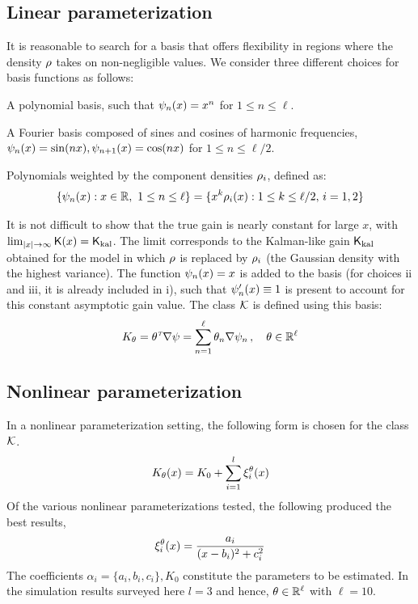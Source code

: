 \subsection*{Linear parameterization}
\label{s:linear_param}
It is reasonable to search for a basis that offers flexibility in regions where the density $\rho$ takes on non-negligible values. We consider three different choices for basis functions as follows:
\begin{romannum}
\item A polynomial basis, such that $\psi_n(x) = x^n$ for $1 \leq n \leq \ell$.
\item A Fourier basis composed of sines and cosines of harmonic frequencies, $\psi_n(x) = \sin(n x), \psi_{n+1}(x) = \cos(n x)$ for $1 \leq n \leq \ell/2$.
\item Polynomials weighted by the component densities $\rho_i$, defined as: 
\begin{equation}
\{\basis_n(x) : x\in\Re,\ 1\le n\le \ell\}  = \{ x^k \pr_i(x) :  1\le k \le \ell/2, \,  i=1,2\}
\label{e:wt_polynomial_basis}
\end{equation}
\end{romannum}
It is not difficult to show that the true gain is nearly constant for large $x$, with $\lim_{|x|\to\infty} \text{\sf K}(x) = \sf K_{\text{kal}}$. The limit corresponds to the Kalman-like gain $\sf K_{\text{kal}}$ obtained for the model in which $\rho$ is replaced by $\rho_i$  (the Gaussian density with the highest variance). The function $\psi_n(x) = x$ is added to the basis (for choices ii and iii, it is already included in i), such that $\psi'_n(x)\equiv 1$ is present to account for this constant asymptotic gain value. The class ${\cal K}$ is defined using this basis:
\begin{equation*}
K_\theta = \theta^{{\hbox{\tiny\it T}}}\nabla \psi = \sum_{n=1}^{\ell}\theta_{n}\nabla \psi_{n}\,, \quad\theta\in\mathbb{R}^{\ell}
\end{equation*}

\subsection*{Nonlinear parameterization}
\label{s:nl_param}
In a nonlinear parameterization setting, the following form is chosen for the class ${\cal K}$.
\begin{equation}
K_\param(x) = K_{0} + \sum_{i=1}^{l} \xi_{i}^{\param}(x)
\label{e:nl_param}
\end{equation}
Of the various nonlinear parameterizations tested, the following produced the best results,
\begin{equation}
\xi_{i}^{\param}(x) = \dfrac{a_{i}}{(x -b_{i})^2 + c_{i}^2}
\label{e:nl_basis}
\end{equation}
The coefficients $\alpha_i  = \{a_i, b_i, c_i \}, K_0$ constitute the parameters to be estimated.
In the simulation results surveyed here  $l=3$ and hence, $\theta \in \mathbb{R}^{\ell}$ with $\ell=10$.

